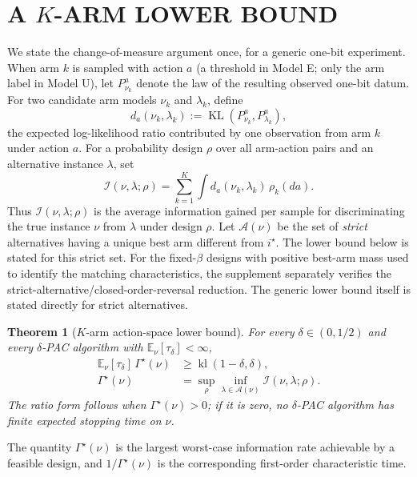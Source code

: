 \documentclass[twoside]{article}
\newtheorem{theorem}{Theorem}
\theoremstyle{definition}
\newcommand{\E}{\mathbb E}
\newcommand{\KL}{\operatorname{KL}}
\newcommand{\kl}{\operatorname{kl}}
\newcommand{\1}{\mathbf 1}
\begin{document}
\section{A $K$-ARM LOWER BOUND}
\label{sec:lower}
We state the change-of-measure argument once, for a generic one-bit experiment.
When arm $k$ is sampled with action $a$ (a threshold in Model E; only the arm
label in Model U), let $P^a_{\nu_k}$ denote the law of the resulting observed
one-bit datum.  For two candidate arm models $\nu_k$ and $\lambda_k$, define
\[
d_a(\nu_k,\lambda_k)
:=
\KL(P^a_{\nu_k},P^a_{\lambda_k}),
\]
the expected log-likelihood ratio contributed by one observation from arm $k$
under action $a$.  For a probability design $\rho$ over all arm-action pairs
and an alternative instance $\lambda$, set
\begin{equation}
\mathcal I(\nu,\lambda;\rho)=\sum_{k=1}^K\int d_a(\nu_k,\lambda_k)\,\rho_k(da).
\label{eq:genericI}
\end{equation}
Thus $\mathcal I(\nu,\lambda;\rho)$ is the average information gained per
sample for discriminating the true instance $\nu$ from $\lambda$ under design
$\rho$.
Let $\mathcal A(\nu)$ be the set of \emph{strict} alternatives having a unique best arm different from $i^\star$.  The lower bound below is stated for this strict set.  For the fixed-$\beta$ designs with positive best-arm mass used to identify
the matching characteristics, the supplement separately verifies the
strict-alternative/closed-order-reversal reduction. The generic lower
bound itself is stated directly for strict alternatives.

\begin{theorem}[$K$-arm action-space lower bound]
\label{thm:KLB}
For every $\delta\in(0,1/2)$ and every $\delta$-PAC algorithm with $\E_\nu[\tau_\delta]<\infty$,
\begin{equation}
\begin{aligned}
\E_\nu[\tau_\delta]\,\Gamma^\star(\nu)
&\ge \kl(1-\delta,\delta),\\
\Gamma^\star(\nu)
&=\sup_{\rho}\inf_{\lambda\in\mathcal A(\nu)}
\mathcal I(\nu,\lambda;\rho).
\end{aligned}
\label{eq:KLB}
\end{equation}
The ratio form follows when $\Gamma^\star(\nu)>0$; if it is zero,
no $\delta$-PAC algorithm has finite expected stopping time on $\nu$.
\end{theorem}

The quantity $\Gamma^\star(\nu)$ is the largest worst-case information rate
achievable by a feasible design, and $1/\Gamma^\star(\nu)$ is the
corresponding first-order characteristic time.
\end{document}
